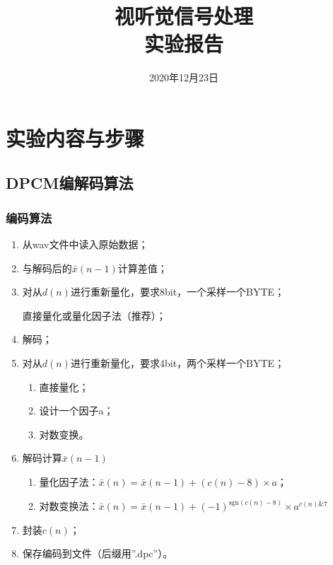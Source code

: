 \documentclass{hitreport}
\title{视听觉信号处理\\实验报告}
\date{2020年12月23日}
\begin{document}
\maketitle

\tableofcontents
\newpage




\section{实验内容与步骤}

\subsection{DPCM编解码算法}

\subsubsection{编码算法}

\begin{enumerate}
\item 从wav文件中读入原始数据；
\item 与解码后的$\bar{x}\left( n - 1 \right) $计算差值；
\item 对从$d\left(n\right)$进行重新量化，要求8bit，一个采样一个BYTE；

直接量化或量化因子法（推荐）；

\item 解码；
\item 对从$d\left(n\right)$进行重新量化，要求4bit，两个采样一个BYTE；

\begin{enumerate}
\item 直接量化；
\item 设计一个因子a；
\item 对数变换。
\end{enumerate}

\item 解码计算$\bar{x}\left(n-1\right)$
\begin{enumerate}
\item 量化因子法：$\bar{x}\left(n\right) = \bar{x}\left(n-1\right) + \left(c\left(n\right) - 8\right) \times a$；
\item 对数变换法：$\bar{x}\left(n\right) = \bar{x}\left(n-1\right) + \left(-1\right)^{\text{sgn}\left(c\left(n\right) - 8\right)} \times a^{c\left(n\right) \& 7}$
\end{enumerate}

\item 封装$c\left(n\right)$；
\item 保存编码到文件（后缀用”.dpc”）。

\end{enumerate}
\end{document}
